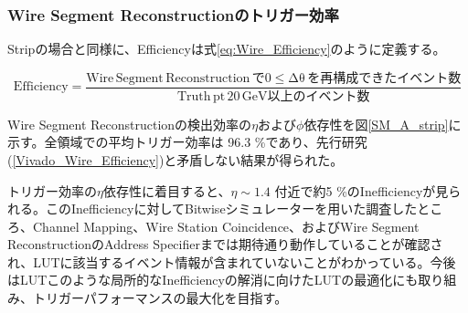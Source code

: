 \subsubsection{Wire Segment Reconstructionのトリガー効率}
\par
Stripの場合と同様に、Efficiencyは式\ref{eq:Wire_Efficiency}のように定義する。

\begin{equation}
    \mathrm {Efficiency} = \frac{\mathrm{Wire\,Segment \,Reconstruction\,で0\leq\Delta\theta\,を再構成できたイベント数}}{\mathrm{Truth\,pt \,20 \,GeV以上のイベント数}}
    \label{eq:Wire_Efficiency}
\end{equation}


Wire Segment Reconstructionの検出効率の$\eta$および$\phi$依存性を図\ref{SM_A_strip}に示す。全領域での平均トリガー効率は 96.3 \%であり、先行研究(\ref{Vivado_Wire_Efficiency})と矛盾しない結果が得られた。

トリガー効率の$\eta$依存性に着目すると、$\eta \sim 1.4$ 付近で約5 \%のInefficiencyが見られる。このInefficiencyに対してBitwiseシミュレーターを用いた調査したところ、Channel Mapping、Wire Station Coincidence、およびWire Segment ReconstructionのAddress Specifierまでは期待通り動作していることが確認され、LUTに該当するイベント情報が含まれていないことがわかっている。今後はLUTこのような局所的なInefficiencyの解消に向けたLUTの最適化にも取り組み、トリガーパフォーマンスの最大化を目指す。

